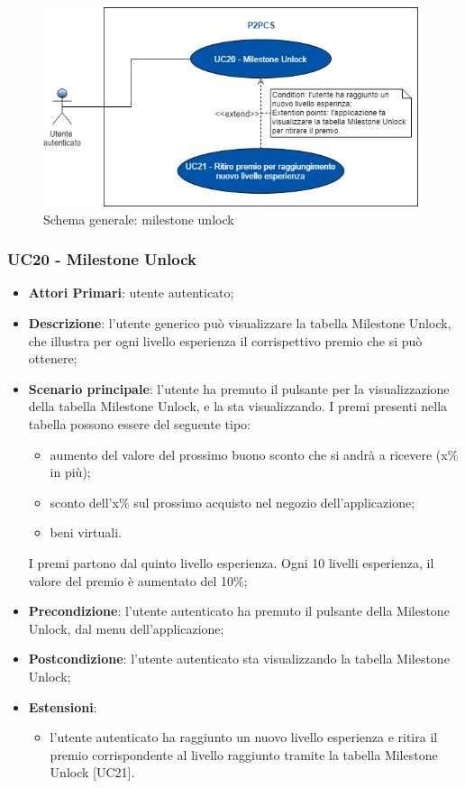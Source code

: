 \begin{figure}[h]
	\includegraphics[width=11cm]{res/images/uc20-21.png}
	\centering
	\caption{Schema generale: milestone unlock}
\end{figure}
\subsubsection{UC20 - Milestone Unlock}
\begin{itemize}
	\item \textbf{Attori Primari}: utente autenticato;
	\item \textbf{Descrizione}: l'utente generico può visualizzare la tabella Milestone Unlock\glo, che illustra per ogni livello esperienza il corrispettivo premio che si può ottenere;	
	\item \textbf{Scenario principale}: l'utente ha premuto il pulsante per la visualizzazione della tabella Milestone Unlock, e la sta visualizzando.
	I premi presenti nella tabella possono essere del seguente tipo:
	\begin{itemize}
		\item aumento del valore del prossimo buono sconto che si andrà a ricevere (x\% in più);
		\item sconto dell'x\% sul prossimo acquisto nel negozio dell'applicazione;
		\item beni virtuali.
	\end{itemize}
	I premi partono dal quinto livello esperienza.
	Ogni 10 livelli esperienza, il valore del premio è aumentato del 10\%;
	\item \textbf{Precondizione}: l'utente autenticato ha premuto il pulsante della Milestone Unlock, dal menu dell'applicazione;
	\item \textbf{Postcondizione}: l'utente autenticato sta visualizzando la tabella Milestone Unlock;
	\item \textbf{Estensioni}:
		\begin{itemize}
			\item l'utente autenticato ha raggiunto un nuovo livello esperienza e ritira il premio corrispondente al livello raggiunto tramite la tabella Milestone Unlock [UC21].
		\end{itemize}
\end{itemize}
